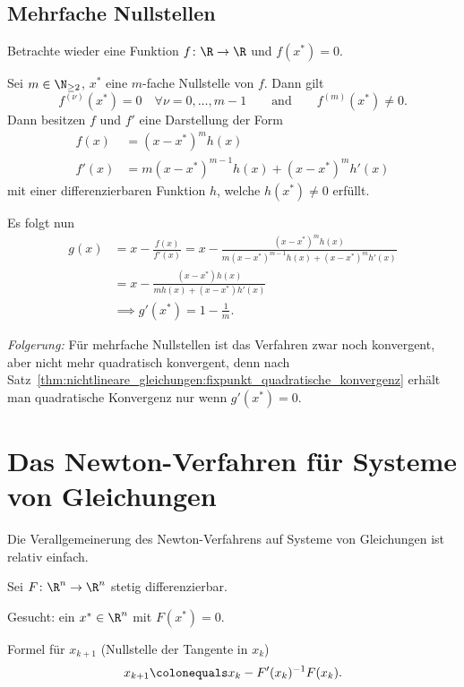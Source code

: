 

\subsection{Mehrfache Nullstellen}

Betrachte wieder eine Funktion $f \colon \R \to \R$ und $f(x^*)=0$.

\medskip

Sei $m \in \N_{\geq 2}$, $x^*$ eine $m$-fache Nullstelle von $f$. Dann gilt
\begin{equation*}
 f^{(\nu)}(x^*)=0 \quad \forall \nu =0,\ldots,m-1
 \qquad \text{and} \qquad
 f^{(m)}(x^*) \neq 0.
\end{equation*}
Dann besitzen $f$ und $f'$ eine Darstellung der Form
\begin{align*}
 f(x) & = (x-x^*)^mh(x) \\
 f'(x) & =m(x-x^*)^{m-1}h(x)+(x-x^*)^mh'(x)
\end{align*}
mit einer differenzierbaren Funktion $h$, welche $h(x^*) \neq 0$ erfüllt.

Es folgt nun
\begin{align*}
 g(x) & = x-\frac{f(x)}{f'(x)}=x-\frac{(x-x^*)^m h(x)}{m(x-x^*)^{m-1} h(x)+(x-x^*)^m h'(x)} \\
 & =x-\frac{(x-x^*)h(x)}{mh(x)+(x-x^*)h'(x)} \\
 & \implies g'(x^*)=1-\frac{1}{m}.
\end{align*}

\emph{Folgerung:} Für mehrfache Nullstellen ist das Verfahren zwar noch konvergent,
aber nicht mehr quadratisch konvergent, denn nach Satz~\ref{thm:nichtlineare_gleichungen:fixpunkt_quadratische_konvergenz}
erhält man quadratische Konvergenz nur wenn $g'(x^*)=0$.


\section{Das Newton-Verfahren für Systeme von Gleichungen}
Die Verallgemeinerung des Newton-Verfahrens auf Systeme von Gleichungen ist relativ einfach.

Sei $F \colon \R^n  \to \R^n$ stetig differenzierbar.

\medskip

Gesucht: ein $x^* \in \R^n$ mit $F(x^*)=0$.

\medskip

Formel für $x_{k+1}$ (Nullstelle der Tangente in $x_k$)
\begin{equation*}
 x_{k+1} \colonequals x_k - F'(x_k)^{-1} F(x_k).
\end{equation*}

